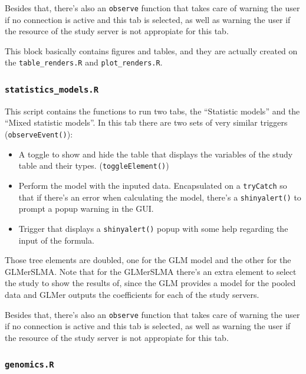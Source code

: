 \documentclass[
]{book}
\providecommand{\tightlist}{%
  \setlength{\itemsep}{0pt}\setlength{\parskip}{0pt}}
\begin{document}
Besides that, there's also an \texttt{observe} function that takes care of warning the user if no connection is active and this tab is selected, as well as warning the user if the resource of the study server is not appropiate for this tab.

This block basically contains figures and tables, and they are actually created on the \texttt{table\_renders.R} and \texttt{plot\_renders.R}.

\hypertarget{statistics_models.r}{%
\subsubsection{\texorpdfstring{\texttt{statistics\_models.R}}{statistics\_models.R}}\label{statistics_models.r}}

This script contains the functions to run two tabs, the ``Statistic models'' and the ``Mixed statistic models''. In this tab there are two sets of very similar triggers (\texttt{observeEvent()}):

\begin{itemize}
\tightlist
\item
  A toggle to show and hide the table that displays the variables of the study table and their types. (\texttt{toggleElement()})
\item
  Perform the model with the inputed data. Encapsulated on a \texttt{tryCatch} so that if there's an error when calculating the model, there's a \texttt{shinyalert()} to prompt a popup warning in the GUI.
\item
  Trigger that displays a \texttt{shinyalert()} popup with some help regarding the input of the formula.
\end{itemize}

Those tree elements are doubled, one for the GLM model and the other for the GLMerSLMA. Note that for the GLMerSLMA there's an extra element to select the study to show the results of, since the GLM provides a model for the pooled data and GLMer outputs the coefficients for each of the study servers.

Besides that, there's also an \texttt{observe} function that takes care of warning the user if no connection is active and this tab is selected, as well as warning the user if the resource of the study server is not appropiate for this tab.

\hypertarget{genomics.r}{%
\subsubsection{\texorpdfstring{\texttt{genomics.R}}{genomics.R}}\label{genomics.r}}
\end{document}

